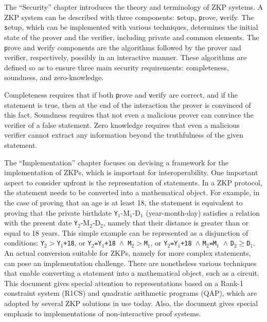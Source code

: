 	The ``Security'' chapter introduces the theory and terminology of ZKP systems.
	A ZKP system can be described with three components: {\texttt setup}, {\texttt prove}, {\texttt verify}. 
	The {\texttt setup}, which can be implemented with various techniques, determines the initial state of the prover and the verifier, including private and common elements.
	The {\texttt prove} and {\texttt verify} components are the algorithms followed by the prover and verifier, respectively, possibly in an interactive manner.
	These algorithms are defined so as to ensure three main security requirements: completeness, soundness, and zero-knowledge.

	Completeness requires that if both {\texttt prove} and {\texttt verify} are correct, and if the statement is true, then at the end of the interaction the prover is convinced of this fact.
	Soundness requires that not even a malicious prover can convince the verifier of a false statement.
	Zero knowledge requires that even a malicious verifier cannot extract any information beyond the truthfulness of the given statement.  


	The ``Implementation'' chapter focuses on devising a framework for the implementation of ZKPs, which is important for interoperability.
	One important aspect to consider upfront is the representation of statements.
	In a ZKP protocol, the statement needs to be converted into a mathematical object.
	For example, in the case of proving that an age is at least 18, the statement is equivalent to proving that the private birthdate {\texttt Y$_1$-M$_1$-D$_1$} (year-month-day) satisfies a relation with the present date {\texttt Y$_2$-M$_2$-D$_2$}, namely that their distance is greater than or equal to 18 years.
	This simple example can be represented as a disjunction of conditions: 
{\tt Y$_2>$Y$_1$+18}, 
or {\tt Y$_2$=Y$_1$+18}~$\wedge$~{\tt M$_2$}$>${\tt M$_1$},
or {\tt Y$_2$=Y$_1$+18 }$\wedge${ \tt M$_2$=M$_1$ }$\wedge${ \tt D$_2$}$\geq${\tt D$_1$}.
	An actual conversion suitable for ZKPs, namely for more complex statements, can pose an implementation challenge. 
    There are nonetheless various techniques that enable converting a statement into a mathematical object, such as a circuit.
    This document gives special attention to representations based on a Rank-1 constraint system (R1CS) and quadratic arithmetic programs (QAP), which are adopted by several ZKP solutions in use today.
	Also, the document gives special emphasis to implementations of non-interactive proof systems.
\loosen


